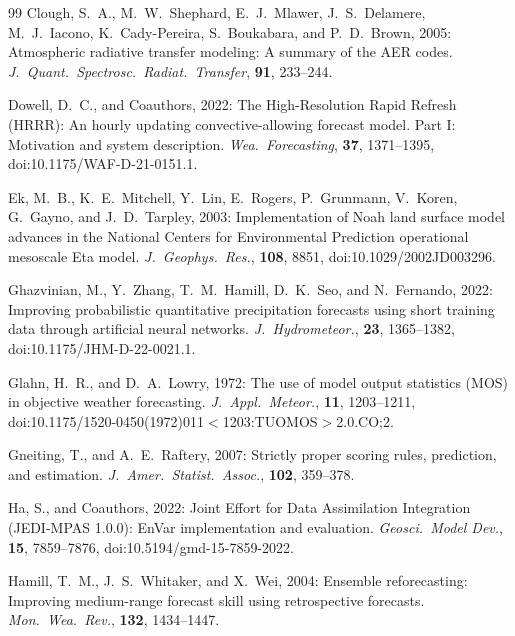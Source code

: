 \documentclass[11pt]{article}
\begin{document}
\begin{thebibliography}{99}
Clough, S.~A., M.~W.\ Shephard, E.~J.\ Mlawer, J.~S.\ Delamere,
M.~J.\ Iacono, K.\ Cady-Pereira, S.\ Boukabara, and P.~D.\ Brown, 2005:
Atmospheric radiative transfer modeling: A summary of the AER codes.
\textit{J.\ Quant.\ Spectrosc.\ Radiat.\ Transfer}, \textbf{91}, 233--244.

Dowell, D.~C., and Coauthors, 2022:
The High-Resolution Rapid Refresh (HRRR): An hourly updating convective-allowing
forecast model. Part I: Motivation and system description.
\textit{Wea.\ Forecasting}, \textbf{37}, 1371--1395,
doi:10.1175/WAF-D-21-0151.1.

Ek, M.~B., K.~E.\ Mitchell, Y.\ Lin, E.\ Rogers, P.\ Grunmann,
V.\ Koren, G.\ Gayno, and J.~D.\ Tarpley, 2003:
Implementation of Noah land surface model advances in the National
Centers for Environmental Prediction operational mesoscale Eta model.
\textit{J.\ Geophys.\ Res.}, \textbf{108}, 8851,
doi:10.1029/2002JD003296.

Ghazvinian, M., Y.\ Zhang, T.~M.\ Hamill, D.~K.\ Seo, and
N.\ Fernando, 2022:
Improving probabilistic quantitative precipitation forecasts using
short training data through artificial neural networks.
\textit{J.\ Hydrometeor.}, \textbf{23}, 1365--1382,
doi:10.1175/JHM-D-22-0021.1.

Glahn, H.~R., and D.~A.\ Lowry, 1972:
The use of model output statistics (MOS) in objective weather
forecasting.
\textit{J.\ Appl.\ Meteor.}, \textbf{11}, 1203--1211,
doi:10.1175/1520-0450(1972)011$<$1203:TUOMOS$>$2.0.CO;2.

Gneiting, T., and A.~E.\ Raftery, 2007:
Strictly proper scoring rules, prediction, and estimation.
\textit{J.\ Amer.\ Statist.\ Assoc.}, \textbf{102}, 359--378.

Ha, S., and Coauthors, 2022:
Joint Effort for Data Assimilation Integration (JEDI-MPAS 1.0.0):
EnVar implementation and evaluation.
\textit{Geosci.\ Model Dev.}, \textbf{15}, 7859--7876,
doi:10.5194/gmd-15-7859-2022.

Hamill, T.~M., J.~S.\ Whitaker, and X.\ Wei, 2004:
Ensemble reforecasting: Improving medium-range forecast skill
using retrospective forecasts.
\textit{Mon.\ Wea.\ Rev.}, \textbf{132}, 1434--1447.


\end{thebibliography}
\end{document}
